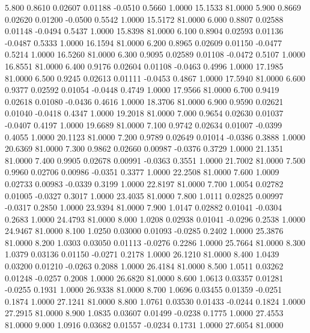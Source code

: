    5.800   0.8610   0.02607   0.01188  -0.0510   0.5660   1.0000  15.1533  81.0000
   5.900   0.8669   0.02620   0.01200  -0.0500   0.5542   1.0000  15.5172  81.0000
   6.000   0.8807   0.02588   0.01148  -0.0494   0.5437   1.0000  15.8398  81.0000
   6.100   0.8904   0.02593   0.01136  -0.0487   0.5333   1.0000  16.1594  81.0000
   6.200   0.8965   0.02609   0.01150  -0.0477   0.5214   1.0000  16.5260  81.0000
   6.300   0.9095   0.02589   0.01108  -0.0472   0.5107   1.0000  16.8551  81.0000
   6.400   0.9176   0.02604   0.01108  -0.0463   0.4996   1.0000  17.1985  81.0000
   6.500   0.9245   0.02613   0.01111  -0.0453   0.4867   1.0000  17.5940  81.0000
   6.600   0.9377   0.02592   0.01054  -0.0448   0.4749   1.0000  17.9566  81.0000
   6.700   0.9419   0.02618   0.01080  -0.0436   0.4616   1.0000  18.3706  81.0000
   6.900   0.9590   0.02621   0.01040  -0.0418   0.4347   1.0000  19.2018  81.0000
   7.000   0.9654   0.02630   0.01037  -0.0407   0.4197   1.0000  19.6689  81.0000
   7.100   0.9742   0.02634   0.01007  -0.0399   0.4055   1.0000  20.1123  81.0000
   7.200   0.9789   0.02649   0.01014  -0.0386   0.3888   1.0000  20.6369  81.0000
   7.300   0.9862   0.02660   0.00987  -0.0376   0.3729   1.0000  21.1351  81.0000
   7.400   0.9905   0.02678   0.00991  -0.0363   0.3551   1.0000  21.7002  81.0000
   7.500   0.9960   0.02706   0.00986  -0.0351   0.3377   1.0000  22.2508  81.0000
   7.600   1.0009   0.02733   0.00983  -0.0339   0.3199   1.0000  22.8197  81.0000
   7.700   1.0054   0.02782   0.01005  -0.0327   0.3017   1.0000  23.4035  81.0000
   7.800   1.0111   0.02825   0.00997  -0.0317   0.2850   1.0000  23.9394  81.0000
   7.900   1.0147   0.02882   0.01041  -0.0304   0.2683   1.0000  24.4793  81.0000
   8.000   1.0208   0.02938   0.01041  -0.0296   0.2538   1.0000  24.9467  81.0000
   8.100   1.0250   0.03000   0.01093  -0.0285   0.2402   1.0000  25.3876  81.0000
   8.200   1.0303   0.03050   0.01113  -0.0276   0.2286   1.0000  25.7664  81.0000
   8.300   1.0379   0.03136   0.01150  -0.0271   0.2178   1.0000  26.1210  81.0000
   8.400   1.0439   0.03200   0.01210  -0.0263   0.2088   1.0000  26.4184  81.0000
   8.500   1.0511   0.03262   0.01248  -0.0257   0.2008   1.0000  26.6820  81.0000
   8.600   1.0613   0.03357   0.01281  -0.0255   0.1931   1.0000  26.9338  81.0000
   8.700   1.0696   0.03455   0.01359  -0.0251   0.1874   1.0000  27.1241  81.0000
   8.800   1.0761   0.03530   0.01433  -0.0244   0.1824   1.0000  27.2915  81.0000
   8.900   1.0835   0.03607   0.01499  -0.0238   0.1775   1.0000  27.4553  81.0000
   9.000   1.0916   0.03682   0.01557  -0.0234   0.1731   1.0000  27.6054  81.0000
